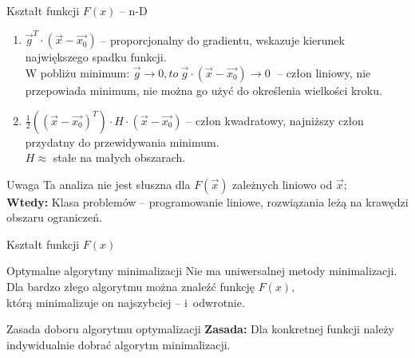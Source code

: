   \begin{frame}{Kształt funkcji $ F(x) $ -- n-D}
    \begin{enumerate}
      \item $ \vec{g}^T \cdot (\vec{x} - \vec{x_0}) $ -- proporcjonalny do
      gradientu, wskazuje kierunek największego spadku funkcji.\\
      W pobliżu minimum: $ \vec{g} \to 0{, to}\ \vec{g}\cdot(\vec{x} - \vec{x_0}) \to 0
      \;$ -- człon liniowy, nie przepowiada minimum,
      nie można go użyć do określenia wielkości kroku.

      \item $ \frac{1}{2}((\vec{x} - \vec{x_0})^T) \cdot H \cdot (\vec{x} - \vec{x_0}) $
      -- człon kwadratowy, najniższy człon przydatny do przewidywania minimum.\\
      $ H \approx $ stałe na małych obszarach.
    \end{enumerate}

    \begin{alertblock}{Uwaga}
      Ta analiza nie jest słuszna dla $ F(\vec{x}) $ zależnych liniowo
      od $ \vec{x} $;\\
      \textbf{Wtedy:} Klasa problemów -- programowanie liniowe, rozwiązania leżą na krawędzi obszaru ograniczeń.
    \end{alertblock}
  \end{frame}

  \begin{frame}{Kształt funkcji $ F(x) $}
    \begin{block}{Optymalne algorytmy minimalizacji}
      Nie ma uniwersalnej metody minimalizacji. \\
      Dla bardzo złego algorytmu można znaleźć funkcję $ F(x) $,\\
      którą minimalizuje on najszybciej -- i~odwrotnie.
    \end{block}
    \begin{block}{Zasada doboru algorytmu optymalizacji}
      \textbf{Zasada:} Dla konkretnej funkcji należy indywidualnie dobrać algorytm minimalizacji.
    \end{block}

  \end{frame}
